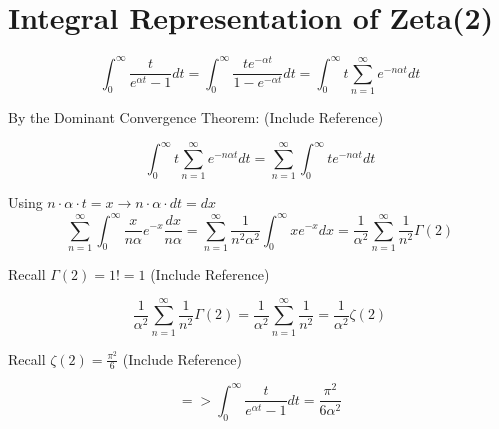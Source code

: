 \documentclass[a4paper]{article}
\author{Emil Kerimov}
\numberwithin{equation}{subsection}
\begin{document}
\section{Integral Representation of Zeta(2)}\label{Integral Representation of Zeta(2)} 

$$
\int_{0}^{\infty}\frac{t}{e^{\alpha t}-1}dt
=\int_{0}^{\infty}\frac{te^{-\alpha t}}{1-e^{-\alpha t}}dt 
= \int_{0}^{\infty} t\sum\limits_{n=1}^{\infty} e^{-n\alpha t}dt
$$

By the Dominant Convergence Theorem: (Include Reference)

$$ \int_{0}^{\infty} t\sum\limits_{n=1}^{\infty} e^{-n\alpha t} dt
=\sum\limits_{n=1}^{\infty} \int_{0}^{\infty}  te^{-n\alpha t}dt$$

Using  $n\cdot \alpha \cdot t = x  \rightarrow n\cdot \alpha \cdot dt = dx$ 
$$
\sum\limits_{n=1}^{\infty} \int_{0}^{\infty}  \frac{x}{n\alpha}e^{-x}\frac{dx}{n\alpha}
=\sum\limits_{n=1}^{\infty} \frac{1}{n^2 \alpha^2 }\int_{0}^{\infty}  xe^{-x}dx
=\frac{1}{\alpha^2}\sum\limits_{n=1}^{\infty} \frac{1}{n^2}\Gamma(2)
$$

Recall $\Gamma(2) = 1! = 1$ (Include Reference)

$$\frac{1}{\alpha^2}\sum\limits_{n=1}^{\infty} \frac{1}{n^2}\Gamma(2)
=\frac{1}{\alpha^2}\sum\limits_{n=1}^{\infty} \frac{1}{n^2}
= \frac{1}{\alpha^2} \zeta(2)
$$

Recall $\zeta(2) = \frac{\pi^2}{6}$ (Include Reference)

$$
=>   \int_{0}^{\infty}\frac{t}{e^{\alpha t}-1}dt
=\frac{\pi^2}{6\alpha^2}
$$
\end{document}
